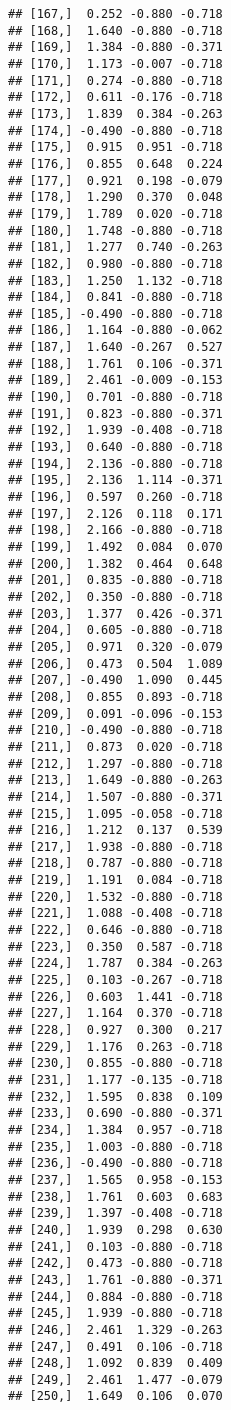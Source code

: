 \documentclass[
]{article}
\begin{document}
\begin{verbatim}
## [167,]  0.252 -0.880 -0.718
## [168,]  1.640 -0.880 -0.718
## [169,]  1.384 -0.880 -0.371
## [170,]  1.173 -0.007 -0.718
## [171,]  0.274 -0.880 -0.718
## [172,]  0.611 -0.176 -0.718
## [173,]  1.839  0.384 -0.263
## [174,] -0.490 -0.880 -0.718
## [175,]  0.915  0.951 -0.718
## [176,]  0.855  0.648  0.224
## [177,]  0.921  0.198 -0.079
## [178,]  1.290  0.370  0.048
## [179,]  1.789  0.020 -0.718
## [180,]  1.748 -0.880 -0.718
## [181,]  1.277  0.740 -0.263
## [182,]  0.980 -0.880 -0.718
## [183,]  1.250  1.132 -0.718
## [184,]  0.841 -0.880 -0.718
## [185,] -0.490 -0.880 -0.718
## [186,]  1.164 -0.880 -0.062
## [187,]  1.640 -0.267  0.527
## [188,]  1.761  0.106 -0.371
## [189,]  2.461 -0.009 -0.153
## [190,]  0.701 -0.880 -0.718
## [191,]  0.823 -0.880 -0.371
## [192,]  1.939 -0.408 -0.718
## [193,]  0.640 -0.880 -0.718
## [194,]  2.136 -0.880 -0.718
## [195,]  2.136  1.114 -0.371
## [196,]  0.597  0.260 -0.718
## [197,]  2.126  0.118  0.171
## [198,]  2.166 -0.880 -0.718
## [199,]  1.492  0.084  0.070
## [200,]  1.382  0.464  0.648
## [201,]  0.835 -0.880 -0.718
## [202,]  0.350 -0.880 -0.718
## [203,]  1.377  0.426 -0.371
## [204,]  0.605 -0.880 -0.718
## [205,]  0.971  0.320 -0.079
## [206,]  0.473  0.504  1.089
## [207,] -0.490  1.090  0.445
## [208,]  0.855  0.893 -0.718
## [209,]  0.091 -0.096 -0.153
## [210,] -0.490 -0.880 -0.718
## [211,]  0.873  0.020 -0.718
## [212,]  1.297 -0.880 -0.718
## [213,]  1.649 -0.880 -0.263
## [214,]  1.507 -0.880 -0.371
## [215,]  1.095 -0.058 -0.718
## [216,]  1.212  0.137  0.539
## [217,]  1.938 -0.880 -0.718
## [218,]  0.787 -0.880 -0.718
## [219,]  1.191  0.084 -0.718
## [220,]  1.532 -0.880 -0.718
## [221,]  1.088 -0.408 -0.718
## [222,]  0.646 -0.880 -0.718
## [223,]  0.350  0.587 -0.718
## [224,]  1.787  0.384 -0.263
## [225,]  0.103 -0.267 -0.718
## [226,]  0.603  1.441 -0.718
## [227,]  1.164  0.370 -0.718
## [228,]  0.927  0.300  0.217
## [229,]  1.176  0.263 -0.718
## [230,]  0.855 -0.880 -0.718
## [231,]  1.177 -0.135 -0.718
## [232,]  1.595  0.838  0.109
## [233,]  0.690 -0.880 -0.371
## [234,]  1.384  0.957 -0.718
## [235,]  1.003 -0.880 -0.718
## [236,] -0.490 -0.880 -0.718
## [237,]  1.565  0.958 -0.153
## [238,]  1.761  0.603  0.683
## [239,]  1.397 -0.408 -0.718
## [240,]  1.939  0.298  0.630
## [241,]  0.103 -0.880 -0.718
## [242,]  0.473 -0.880 -0.718
## [243,]  1.761 -0.880 -0.371
## [244,]  0.884 -0.880 -0.718
## [245,]  1.939 -0.880 -0.718
## [246,]  2.461  1.329 -0.263
## [247,]  0.491  0.106 -0.718
## [248,]  1.092  0.839  0.409
## [249,]  2.461  1.477 -0.079
## [250,]  1.649  0.106  0.070

\end{verbatim}
\end{document}
